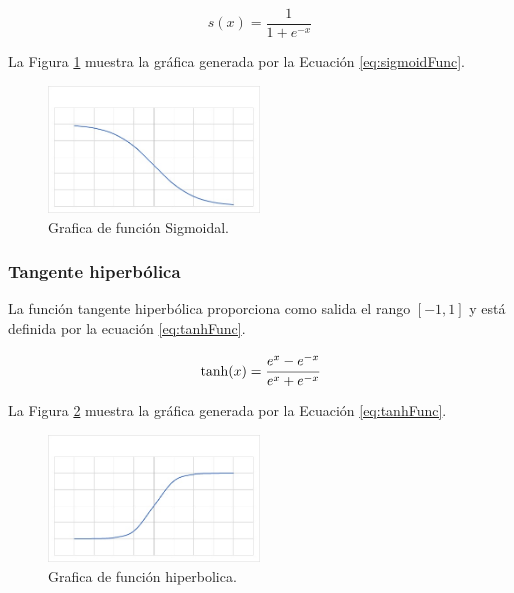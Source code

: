 \begin{equation}
\label{eq:sigmoidFunc}
    s(x)={\frac {1}{1+e^{-x}}}
\end{equation}

La Figura \ref{fig:graficaSigmoidal} muestra la gráfica generada por la Ecuación \ref{eq:sigmoidFunc}.

\begin{figure}[H]
    \centering
    \includegraphics[width=0.5\textwidth]{MarcoTeorico/imgs/GraficaSigmoidal.jpg}
    \caption{Grafica de función Sigmoidal.}
    \label{fig:graficaSigmoidal}
\end{figure}

\subsubsection{Tangente hiperbólica}

La función tangente hiperbólica proporciona como salida el rango $[-1,1]$ y está definida por la ecuación \ref{eq:tanhFunc}.

\begin{equation}
\label{eq:tanhFunc}
    \tanh (x)={\cfrac {e^{x}-e^{-x}}{e^{x}+e^{-x}}}
\end{equation}

La Figura \ref{fig:graficaHiperbolica} muestra la gráfica generada por la Ecuación \ref{eq:tanhFunc}.

\begin{figure}[H]
    \centering
    \includegraphics[width=0.5\textwidth]{MarcoTeorico/imgs/GraficaHiperbolica.jpg}
    \caption{Grafica de función hiperbolica.}
    \label{fig:graficaHiperbolica}
\end{figure}

